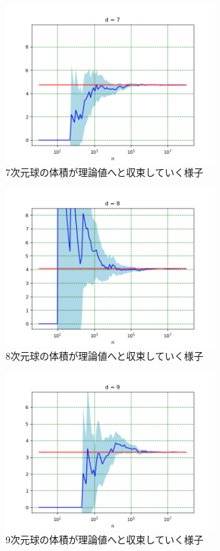 \documentclass[a4paper,twoside]{jarticle}
\begin{document}
\begin{figure}[H]
\begin{center}
\includegraphics[width=8cm]{../python/report1_monte_carlo/out/r2plot7d.png}
\end{center}
\caption{7次元球の体積が理論値へと収束していく様子}
\end{figure}

\begin{figure}[H]
\begin{center}
\includegraphics[width=8cm]{../python/report1_monte_carlo/out/r2plot8d.png}
\end{center}
\caption{8次元球の体積が理論値へと収束していく様子}
\end{figure}

\begin{figure}[H]
\begin{center}
\includegraphics[width=8cm]{../python/report1_monte_carlo/out/r2plot9d.png}
\end{center}
\caption{9次元球の体積が理論値へと収束していく様子}
\end{figure}
\end{document}
